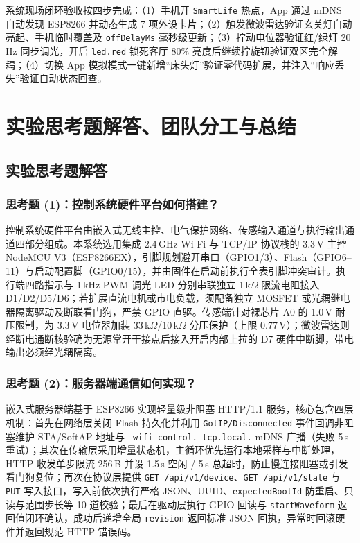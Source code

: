 \documentclass[10.5pt,a4paper]{ctexart}
\newcommand{\code}[1]{{\ttfamily\small\nolinkurl{#1}}}
\begin{document}
系统现场闭环验收按四步完成：（1）手机开 \code{SmartLife} 热点，App 通过 mDNS 自动发现 ESP8266 并动态生成 7 项外设卡片；（2）触发微波雷达验证玄关灯自动亮起、手机临时覆盖及 \code{offDelayMs} 毫秒级更新；（3）拧动电位器验证红/绿灯 20\,Hz 同步调光，开启 \code{led.red} 锁死客厅 80\% 亮度后继续拧旋钮验证双区完全解耦；（4）切换 App 模拟模式一键新增“床头灯”验证零代码扩展，并注入“响应丢失”验证自动状态回查。

\section{实验思考题解答、团队分工与总结}

\subsection{实验思考题解答}

\subsubsection{思考题 (1)：控制系统硬件平台如何搭建？}
控制系统硬件平台由嵌入式无线主控、电气保护网络、传感输入通道与执行输出通道四部分组成。本系统选用集成 2.4\,GHz Wi-Fi 与 TCP/IP 协议栈的 3.3\,V 主控 NodeMCU V3（ESP8266EX），引脚规划避开串口（GPIO1/3）、Flash（GPIO6--11）与启动配置脚（GPIO0/15），并由固件在启动前执行全表引脚冲突审计。执行端四路指示与 1\,kHz PWM 调光 LED 分别串联独立 1\,k$\Omega$ 限流电阻接入 D1/D2/D5/D6；若扩展直流电机或市电负载，须配备独立 MOSFET 或光耦继电器隔离驱动及断联看门狗，严禁 GPIO 直驱。传感端针对裸芯片 A0 的 1.0\,V 耐压限制，为 3.3\,V 电位器加装 33\,k$\Omega$/10\,k$\Omega$ 分压保护（上限 0.77\,V）；微波雷达则经断电通断核验确为无源常开干接点后接入开启内部上拉的 D7 硬件中断脚，带电输出必须经光耦隔离。

\subsubsection{思考题 (2)：服务器端通信如何实现？}
嵌入式服务器端基于 ESP8266 实现轻量级非阻塞 HTTP/1.1 服务，核心包含四层机制：首先在网络层关闭 Flash 持久化并利用 \code{GotIP/Disconnected} 事件回调非阻塞维护 STA/SoftAP 地址与 \code{_wifi-control._tcp.local.} mDNS 广播（失败 5\,s 重试）；其次在传输层采用增量状态机，主循环优先运行本地采样与中断处理，HTTP 收发单步限流 256\,B 并设 1.5\,s 空闲 / 5\,s 总超时，防止慢连接阻塞或引发看门狗复位；再次在协议层提供 \texttt{GET /api/v1/device}、\texttt{GET /api/v1/state} 与 \texttt{PUT} 写入接口，写入前依次执行严格 JSON、UUID、\code{expectedBootId} 防重启、只读与范围步长等 10 道校验；最后在驱动层执行 GPIO 回读与 \code{startWaveform} 返回值闭环确认，成功后递增全局 \code{revision} 返回标准 JSON 回执，异常时回滚硬件并返回规范 HTTP 错误码。
\end{document}
